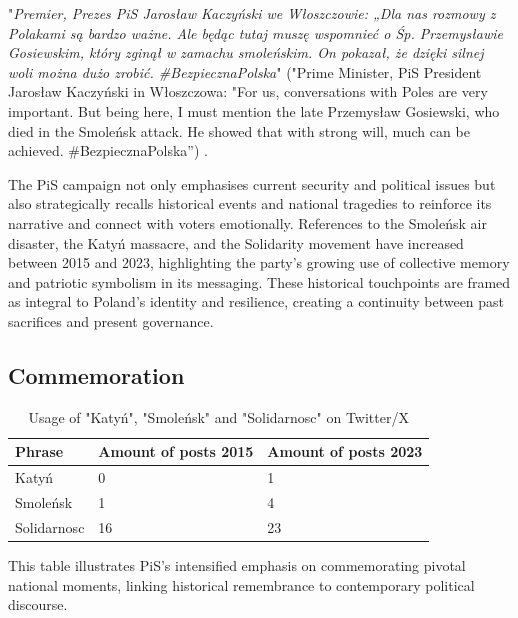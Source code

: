 \begin{displayquote}
    "\textit{Premier, Prezes PiS Jarosław Kaczyński we Włoszczowie: „Dla nas rozmowy z Polakami są bardzo ważne. Ale będąc tutaj muszę wspomnieć o Śp. Przemysławie Gosiewskim, który zginął w zamachu smoleńskim. On pokazał, że dzięki silnej woli można dużo zrobić. \#BezpiecznaPolska}" ("Prime Minister, PiS President Jarosław Kaczyński in Włoszczowa: "For us, conversations with Poles are very important. But being here, I must mention the late Przemysław Gosiewski, who died in the Smoleńsk attack. He showed that with strong will, much can be achieved. \#BezpiecznaPolska”) \citep{pisorgpl2023j}.
\end{displayquote}

The PiS campaign not only emphasises current security and political issues but also strategically recalls historical events and national tragedies to reinforce its narrative and connect with voters emotionally. References to the Smoleńsk air disaster, the Katyń massacre, and the Solidarity movement have increased between 2015 and 2023, highlighting the party's growing use of collective memory and patriotic symbolism in its messaging. These historical touchpoints are framed as integral to Poland's identity and resilience, creating a continuity between past sacrifices and present governance.


\subsection{Commemoration}

\begin{table}[H]
    \centering
    \begin{tabular}{p{4cm}p{4cm}p{4cm}}
        \toprule
        \textbf{Phrase} & \textbf{Amount of posts 2015}  & \textbf{Amount of posts 2023} \\ \midrule
        Katyń & 0 & 1  \\
        Smoleńsk & 1 & 4  \\ 
        Solidarnosc & 16 & 23  \\ \bottomrule
    \end{tabular}
    \caption{Usage of "Katyń", "Smoleńsk" and "Solidarnosc" on Twitter/X \citep{rybicki_2025_16933320}}
    \label{tab:phrases-comp-3-2015-2023}
\end{table}

This table illustrates PiS's intensified emphasis on commemorating pivotal national moments, linking historical remembrance to contemporary political discourse.

